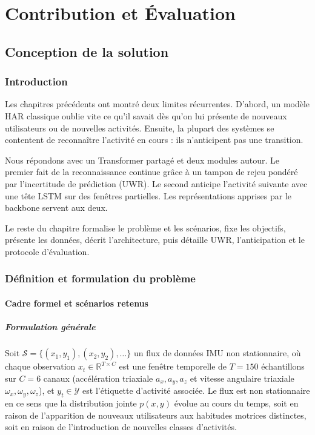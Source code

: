 \part{Contribution et Évaluation}

\chapter{Conception de la solution}
\label{ch:09-Conception}

\section{Introduction}

Les chapitres précédents ont montré deux limites récurrentes. D'abord, un
modèle HAR classique oublie vite ce qu'il savait dès qu'on lui présente de
nouveaux utilisateurs ou de nouvelles activités. Ensuite, la plupart des
systèmes se contentent de reconnaître l'activité en cours : ils n'anticipent
pas une transition.

Nous répondons avec un Transformer partagé et deux modules autour. Le premier
fait de la reconnaissance continue grâce à un tampon de rejeu pondéré par
l'incertitude de prédiction (UWR). Le second anticipe l'activité suivante
avec une tête LSTM sur des fenêtres partielles. Les représentations apprises
par le backbone servent aux deux.

Le reste du chapitre formalise le problème et les scénarios, fixe les
objectifs, présente les données, décrit l'architecture, puis détaille UWR,
l'anticipation et le protocole d'évaluation.

\section{Définition et formulation du problème}

\subsection{Cadre formel et scénarios retenus}

\subsubsection{Formulation générale}

Soit $\mathcal{S} = \{(x_1, y_1), (x_2, y_2), \ldots\}$ un flux de données IMU non stationnaire, où chaque observation $x_t \in \mathbb{R}^{T \times C}$ est une fenêtre temporelle de $T = 150$ échantillons sur $C = 6$ canaux (accélération triaxiale $a_x, a_y, a_z$ et vitesse angulaire triaxiale $\omega_x, \omega_y, \omega_z$), et $y_t \in \mathcal{Y}$ est l'étiquette d'activité associée. Le flux est non stationnaire en ce sens que la distribution jointe $p(x, y)$ évolue au cours du temps, soit en raison de l'apparition de nouveaux utilisateurs aux habitudes motrices distinctes, soit en raison de l'introduction de nouvelles classes d'activités.

